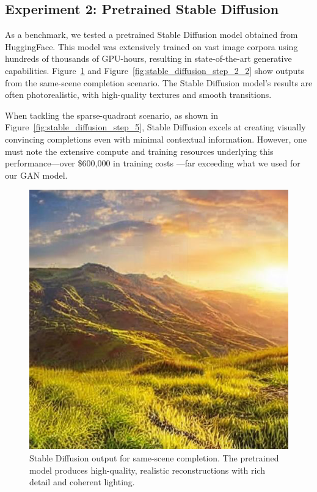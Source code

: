 \documentclass[sigconf]{acmart}
\begin{document}
\subsection*{Experiment 2: Pretrained Stable Diffusion}

As a benchmark, we tested a pretrained Stable Diffusion model \cite{Rombach2022} obtained from HuggingFace. This model was extensively trained on vast image corpora using hundreds of thousands of GPU-hours, resulting in state-of-the-art generative capabilities. Figure~\ref{fig:stable_diffusion_step_2_1} and Figure~\ref{fig:stable_diffusion_step_2_2} show outputs from the same-scene completion scenario. The Stable Diffusion model’s results are often photorealistic, with high-quality textures and smooth transitions. 

When tackling the sparse-quadrant scenario, as shown in Figure~\ref{fig:stable_diffusion_step_5}, Stable Diffusion excels at creating visually convincing completions even with minimal contextual information. However, one must note the extensive compute and training resources underlying this performance—over \$600,000 in training costs \cite{Mostaque2022}—far exceeding what we used for our GAN model.

\begin{figure}[h!]
    \centering
    \includegraphics[width=\linewidth]{stable_diffusion_step_2_1}
    \caption{Stable Diffusion output for same-scene completion. The pretrained model produces high-quality, realistic reconstructions with rich detail and coherent lighting.}
    \label{fig:stable_diffusion_step_2_1}
\end{figure}
\end{document}

